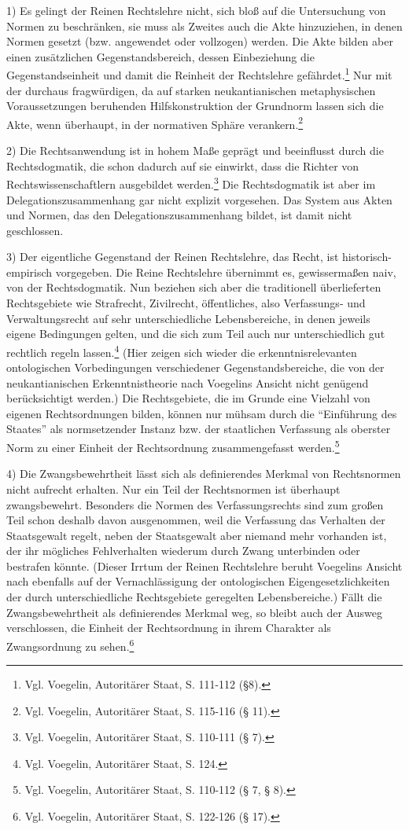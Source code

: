 \documentclass[12pt,a4paper,ngerman]{article}
\begin{document}
1) Es gelingt der Reinen Rechtslehre nicht, sich bloß auf die
Untersuchung von Normen zu beschränken, sie muss als Zweites auch die
Akte hinzuziehen, in denen Normen gesetzt (bzw. angewendet oder
vollzogen) werden. Die Akte bilden aber einen zusätzlichen
Gegenstandsbereich, dessen Einbeziehung die Gegenstandseinheit und
damit die Reinheit der Rechtslehre gefährdet.\footnote{Vgl. Voegelin,
  Autoritärer Staat, S. 111-112 (§8).} Nur mit der durchaus
fragwürdigen, da auf starken neukantianischen metaphysischen
Voraussetzungen beruhenden Hilfskonstruktion der Grundnorm lassen sich
die Akte, wenn überhaupt, in der normativen Sphäre
verankern.\footnote{Vgl. Voegelin, Autoritärer Staat, S.  115-116 (§
  11).}

2) Die Rechtsanwendung ist in hohem Maße geprägt und beeinflusst durch
die Rechtsdogmatik, die schon dadurch auf sie einwirkt, dass die
Richter von Rechtswissenschaftlern ausgebildet
werden.\footnote{Vgl. Voegelin, Autoritärer Staat, S. 110-111 (§ 7).} Die
Rechtsdogmatik ist aber im Delegationszusammenhang gar nicht explizit
vorgesehen. Das System aus Akten und Normen, das den
Delegationszusammenhang bildet, ist damit nicht geschlossen.

3) Der eigentliche Gegenstand der Reinen Rechtslehre, das Recht, ist
historisch-empirisch vorgegeben. Die Reine Rechtslehre übernimmt es,
gewissermaßen naiv, von der Rechtsdogmatik. Nun beziehen sich aber die
traditionell überlieferten Rechtsgebiete wie Strafrecht, Zivilrecht,
öffentliches, also Verfassungs- und Verwaltungsrecht auf sehr unterschiedliche
Lebensbereiche, in denen jeweils eigene Bedingungen gelten, und die sich zum
Teil auch nur unterschiedlich gut rechtlich regeln lassen.\footnote{Vgl.
  Voegelin, Autoritärer Staat, S.  124.}  (Hier zeigen sich wieder die
erkenntnisrelevanten ontologischen Vorbedingungen verschiedener
Gegenstandsbereiche, die von der neukantianischen Erkenntnistheorie nach
Voegelins Ansicht nicht genügend berücksichtigt werden.) Die Rechtsgebiete,
die im Grunde eine Vielzahl von eigenen Rechtsordnungen bilden, können nur
mühsam durch die "`Einführung des Staates"' als normsetzender Instanz bzw. der
staatlichen Verfassung als oberster Norm zu einer Einheit der Rechtsordnung
zusammengefasst werden.\footnote{Vgl.  Voegelin, Autoritärer Staat, S. 110-112
  (§ 7, § 8).}

4) Die Zwangsbewehrtheit lässt sich als definierendes Merkmal von Rechtsnormen
nicht aufrecht erhalten. Nur ein Teil der Rechtsnormen ist überhaupt
zwangsbewehrt. Besonders die Normen des Verfassungsrechts sind zum großen Teil
schon deshalb davon ausgenommen, weil die Verfassung das Verhalten der
Staatsgewalt regelt, neben der Staatsgewalt aber niemand mehr vorhanden ist,
der ihr mögliches Fehlverhalten wiederum durch Zwang unterbinden oder
bestrafen könnte.  (Dieser Irrtum der Reinen Rechtslehre beruht Voegelins
Ansicht nach ebenfalls auf der Vernachlässigung der ontologischen
Eigengesetzlichkeiten der durch unterschiedliche Rechtsgebiete geregelten
Lebensbereiche.) Fällt die Zwangsbewehrtheit als definierendes Merkmal weg, so
bleibt auch der Ausweg verschlossen, die Einheit der Rechtsordnung in ihrem
Charakter als Zwangsordnung zu sehen.\footnote{Vgl. Voegelin, Autoritärer
  Staat, S.  122-126 (§ 17).}
\end{document}
